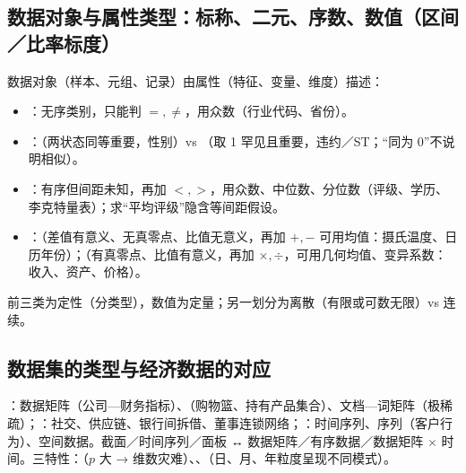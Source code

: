 \subsection{数据对象与属性类型：标称、二元、序数、数值（区间／比率标度）}
数据对象（样本、元组、记录）由属性（特征、变量、维度）描述：
\begin{itemize}
\item {}：无序类别，只能判 $=,\neq$，用众数（行业代码、省份）。
\item {}：（两状态同等重要，性别）vs （取 1 罕见且重要，违约／ST；“同为 0”不说明相似）。
\item {}：有序但间距未知，再加 $<,>$，用众数、中位数、分位数（评级、学历、李克特量表）；求“平均评级”隐含等间距假设。
\item {}：（差值有意义、无真零点、比值无意义，再加 $+,-$ 可用均值：摄氏温度、日历年份）；（有真零点、比值有意义，再加 $\times,\div$，可用几何均值、变异系数：收入、资产、价格）。
\end{itemize}
前三类为定性（分类型），数值为定量；另一划分为离散（有限或可数无限）vs 连续。

\subsection{数据集的类型与经济数据的对应}
：数据矩阵（公司—财务指标）、（购物篮、持有产品集合）、文档—词矩阵（极稀疏）；：社交、供应链、银行间拆借、董事连锁网络；：时间序列、序列（客户行为）、空间数据。截面／时间序列／面板 ↔ 数据矩阵／有序数据／数据矩阵 $\times$ 时间。三特性：（$p$ 大 → 维数灾难）、、（日、月、年粒度呈现不同模式）。

